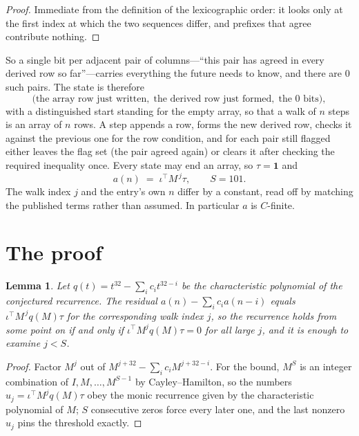 \documentclass[11pt,a4paper]{article}
\theoremstyle{plain}
\newtheorem{lemma}[theorem]{Lemma}
\theoremstyle{definition}
\begin{document}
\begin{proof}
Immediate from the definition of the lexicographic order: it looks only at the first index at
which the two sequences differ, and prefixes that agree contribute nothing.
\end{proof}

So a single bit per adjacent pair of columns---``this pair has agreed in every derived row so
far''---carries everything the future needs to know, and there are $0$ such pairs. The state
is therefore
\[
\bigl(\text{the array row just written},\; \text{the derived row just formed},\;
\text{the 0 bits}\bigr),
\]
with a distinguished start standing for the empty array, so that a walk of $n$ steps is an array
of $n$ rows. A step appends a row, forms the new derived row, checks it against the previous one
for the row condition, and for each pair still flagged either leaves the flag set (the pair
agreed again) or clears it after checking the required inequality once. Every state may end an
array, so $\tau=\mathbf{1}$ and
\[
a(n)\;=\;\iota^{\!\top}M^{\,j}\tau ,\qquad S=101.
\]
The walk index $j$ and the entry's own $n$ differ by a constant, read off by matching the
published terms rather than assumed. In particular $a$ is $C$-finite.

\section{The proof}

\begin{lemma}\label{lem:crit}
Let $q(t)=t^{32}-\sum_i c_it^{32-i}$ be the characteristic polynomial of the
conjectured recurrence. The residual $a(n)-\sum_ic_ia(n-i)$ equals
$\iota^{\!\top}M^{\,j}q(M)\tau$ for the corresponding walk index $j$, so the recurrence
holds from some point on if and only if $\iota^{\!\top}M^{j}q(M)\tau=0$ for all large $j$,
and it is enough to examine $j<S$.
\end{lemma}

\begin{proof}
Factor $M^{j}$ out of $M^{j+32}-\sum_ic_iM^{j+32-i}$. For the bound, $M^{S}$
is an integer combination of $I,M,\dots,M^{S-1}$ by Cayley--Hamilton, so the numbers
$u_j=\iota^{\!\top}M^{j}q(M)\tau$ obey the monic recurrence given by the characteristic
polynomial of $M$; $S$ consecutive zeros force every later one, and the last nonzero $u_j$
pins the threshold exactly.
\end{proof}
\end{document}
